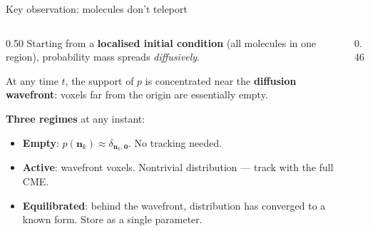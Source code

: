 \documentclass[10pt,aspectratio=169]{beamer}
\begin{document}
\begin{frame}{Key observation: molecules don't teleport}

  \begin{columns}[T]
    \begin{column}{0.50\textwidth}
      Starting from a \textbf{localised initial condition} (all molecules in one
      region), probability mass spreads \emph{diffusively}.

      \medskip
      At any time $t$, the support of $p$ is concentrated near the
      \textbf{diffusion wavefront}: voxels far from the origin are essentially empty.

      \bigskip
      \textbf{Three regimes} at any instant:
      \medskip
      \begin{itemize}\setlength\itemsep{0.5em}
        \item[\textcolor{emptycolor}{\rule{8pt}{8pt}}]
              \textbf{Empty}: $p(\bm{n}_k) \approx \delta_{\bm{n}_k,\bm{0}}$.
              No tracking needed.
        \item[\textcolor{activecolor}{\rule{8pt}{8pt}}]
              \textbf{Active}: wavefront voxels. Nontrivial distribution —
              track with the full CME.
        \item[\textcolor{equilcolor}{\rule{8pt}{8pt}}]
              \textbf{Equilibrated}: behind the wavefront, distribution
              has converged to a known form. Store as a single parameter.
      \end{itemize}
    \end{column}
    \begin{column}{0.46\textwidth}
      \begin{center}
\end{center}
\end{column}
\end{columns}
\end{frame}
\end{document}
